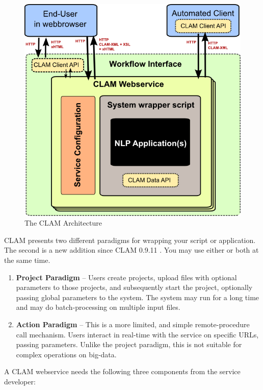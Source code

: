 \documentclass[a4paper,12pt,twoside,openright]{report}
\begin{document}
\begin{figure}[h] \begin{center}
\includegraphics[width=130.0mm]{architecture.png}
\end{center}
\caption{The CLAM Architecture}
\label{fig:arch} 
\end{figure}

CLAM presents two different paradigms for wrapping your script or application.
The second is a new addition since CLAM 0.9.11 . You may use either or both at
the same time.

\begin{enumerate}
  \item \textbf{Project Paradigm} -- Users create projects, upload files with
    optional parameters to those projects, and subsequently start the project,
    optionally passing global parameters to the system. The system may run for
    a long time and may do batch-processing on multiple input files. 
  \item \textbf{Action Paradigm} -- This is a more limited, and simple
    remote-procedure call mechanism. Users interact in real-time with the service on
    specific URLs, passing parameters. Unlike the project paradigm, this is not
    suitable for complex operations on big-data.
\end{enumerate}

A CLAM webservice needs the following three components from the service developer:
\end{document}
